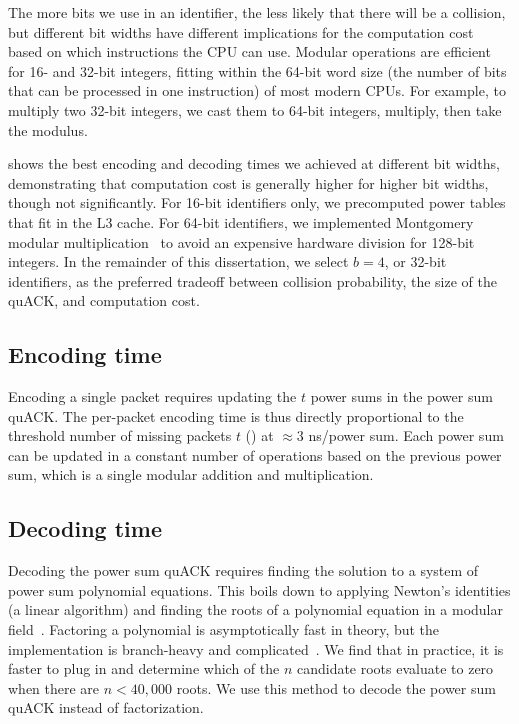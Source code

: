 The more bits we use in an identifier, the less likely that there will be a
collision, but different bit widths have different implications for the
computation cost based on which instructions the CPU can use. Modular
operations are efficient for 16- and 32-bit integers, fitting within the 64-bit
word size (the number of bits that can be processed in one instruction) of most
modern CPUs. For example, to multiply two 32-bit integers, we cast them to
64-bit integers, multiply, then take the modulus.

 shows the best encoding and decoding times we achieved
at different bit widths, demonstrating that computation cost is generally higher
for higher bit widths, though not significantly. For 16-bit identifiers only, we
precomputed power tables that fit in the L3 cache. For 64-bit identifiers, we
implemented Montgomery modular multiplication~\cite{montgomery1985modular}
to avoid an expensive hardware division for 128-bit integers. In the remainder
of this dissertation, we select $b=4$, or 32-bit identifiers, as the preferred
tradeoff between collision probability, the size of the quACK, and computation
cost.

\subsection{Encoding time}
\label{sec:quack:psum-microbenchmarks:encoding}

Encoding a single packet requires updating the $t$ power sums in the power sum
quACK.
The per-packet encoding time is thus directly proportional to the threshold
number of missing packets $t$ () at
$\approx 3$ ns/power sum.
Each power sum can be updated in a constant number of operations based on the
previous power sum, which is a single modular addition and multiplication.

\subsection{Decoding time}
\label{sec:quack:psum-microbenchmarks:decoding}

Decoding the power sum quACK requires finding the solution to a system of power
sum polynomial equations. This boils down to applying Newton's identities (a
linear algorithm) and finding the roots of a polynomial equation in a modular
field~\cite{eppstein2011straggler}.
Factoring a polynomial is asymptotically fast in theory, but the implementation
is branch-heavy and complicated~\cite{batut2000user}.
We find that in practice, it is faster to plug in and determine which of the
$n$ candidate roots evaluate to zero when there are $n < 40,000$ roots.
We use this method to decode the power sum quACK instead of factorization.

